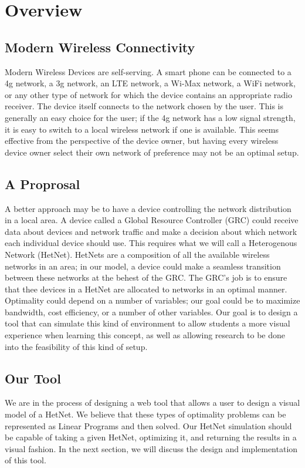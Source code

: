\documentclass[11pt]{article}
\begin{document}
\section{Overview}
\subsection{Modern Wireless Connectivity}
Modern Wireless Devices are self-serving. A smart phone can be connected to a
4g network, a 3g network, an LTE network, a Wi-Max network, a WiFi network, 
or any other type of network for which the device contains an appropriate 
radio receiver. The device itself connects to the network chosen by the user. 
This is generally an easy choice for the user; if the 4g network has a 
low signal strength, it is easy to switch to a local wireless network if one 
is available. This seems effective from the perspective of the device owner, 
but having every wireless device owner select their own network of preference 
may not be an optimal setup.

\subsection{A Proprosal}
A better approach may be to have a device controlling the network distribution
in a local area. A device called a Global Resource Controller (GRC) could receive
data about devices and network traffic and make a decision about which network
each individual device should use. This requires what we will call a Heterogenous 
Network (HetNet). HetNets are a composition of all the available wireless 
networks in an area; in our model, a device could make a seamless transition
between these networks at the behest of the GRC. The GRC's job is to ensure 
that thee devices in a HetNet are allocated to networks in an optimal manner.
Optimality could depend on a number of variables; our goal could be to maximize
bandwidth, cost efficiency, or a number of other variables. Our goal is 
to design a tool that can simulate this kind of environment to allow students 
a more visual experience when learning this concept, as well as allowing research
to be done into the feasibility of this kind of setup.

\subsection{Our Tool}
We are in the process of designing a web tool that allows a user to design a 
visual model of a HetNet. We believe that these types of optimality problems
can be represented as Linear Programs and then solved. Our HetNet simulation
should be capable of taking a given HetNet, optimizing it, and returning the 
results in a visual fashion. In the next section, we will discuss the 
design and implementation of this tool.
\end{document}
